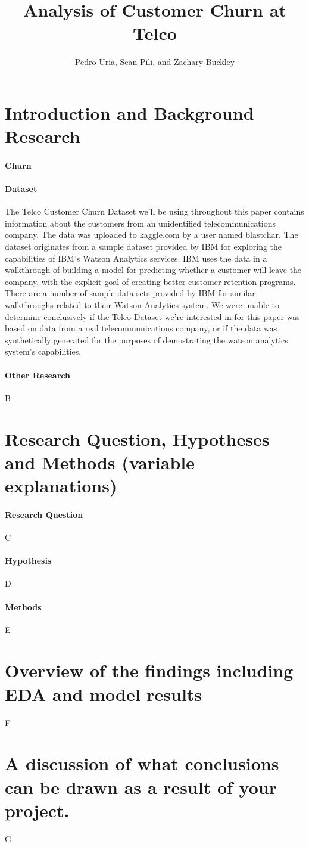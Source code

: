 \documentclass[man]{apa6}
\title{Analysis of Customer Churn at Telco}
\author{Pedro Uria, Sean Pili, and Zachary Buckley}
\affiliation{George Washington University}
\begin{document}
\maketitle

\section{Introduction and Background Research}
\paragraph{Churn}


\paragraph{Dataset}
The Telco Customer Churn Dataset we'll be using throughout this paper contains information about the customers from an unidentified telecommunications company. The data was uploaded to kaggle.com by a user named blastchar. \cite{blastchar_2018} The dataset originates from a sample dataset provided by IBM for exploring the capabilities of IBM's Watson Analytics services. IBM uses the data in a walkthrough of building a model for predicting whether a customer will leave the company, with the explicit goal of creating better customer retention programs. \cite{ibm_telco_2015} There are a number of sample data sets provided by IBM for similar walkthroughs related to their Watson Analytics system. \cite{ibm_data_2015} We were unable to determine conclusively if the Telco Dataset we're interested in for this paper was based on data from a real telecommunications company, or if the data was synthetically generated for the purposes of demostrating the watson analytics system's capabilities.

\paragraph{Other Research}
B

\section{Research Question, Hypotheses and Methods (variable explanations)}
\paragraph{Research Question}
C
\paragraph{Hypothesis}
D
\paragraph{Methods}
E
\section{Overview of the findings including EDA and model results}
F
\section{A discussion of what conclusions can be drawn as a result of your project.}
G
\newpage
\printbibliography
\end{document}
